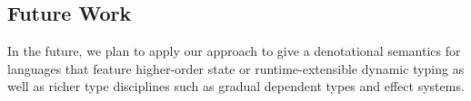 \subsection{Future Work}

In the future, we plan to apply our approach to give a denotational
semantics for languages that feature higher-order state or
runtime-extensible dynamic typing
\cite{DBLP:journals/corr/abs-2210-02169} as well as richer type
disciplines such as gradual dependent types and effect systems.


